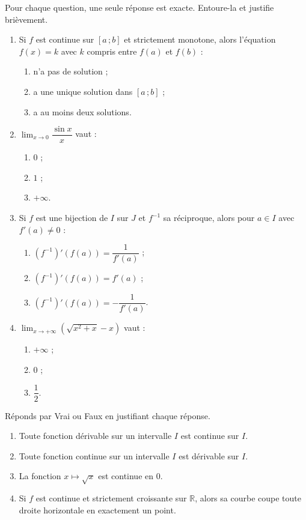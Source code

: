 \documentclass[11pt]{article}
\begin{document}
\begin{exercice}
Pour chaque question, une seule réponse est exacte. Entoure-la et justifie brièvement.
\begin{enumerate}
\item Si $f$ est continue sur $[a\,;b]$ et strictement monotone, alors l'équation $f(x)=k$ avec $k$ compris entre $f(a)$ et $f(b)$ :
\begin{enumerate}
\item n'a pas de solution ;
\item a une unique solution dans $[a\,;b]$ ;
\item a au moins deux solutions.
\end{enumerate}
\item $\displaystyle\lim_{x\to 0}\dfrac{\sin x}{x}$ vaut :
\begin{enumerate}
\item $0$ ; \item $1$ ; \item $+\infty$.
\end{enumerate}
\item Si $f$ est une bijection de $I$ sur $J$ et $f^{-1}$ sa réciproque, alors pour $a\in I$ avec $f'(a)\neq 0$ :
\begin{enumerate}
\item $(f^{-1})'(f(a))=\dfrac{1}{f'(a)}$ ;
\item $(f^{-1})'(f(a))=f'(a)$ ;
\item $(f^{-1})'(f(a))=-\dfrac{1}{f'(a)}$.
\end{enumerate}
\item $\displaystyle\lim_{x\to +\infty}\left(\sqrt{x^2+x}-x\right)$ vaut :
\begin{enumerate}
\item $+\infty$ ; \item $0$ ; \item $\dfrac{1}{2}$.
\end{enumerate}
\end{enumerate}
\end{exercice}

\begin{exercice}
Réponds par Vrai ou Faux en justifiant chaque réponse.
\begin{enumerate}
\item Toute fonction dérivable sur un intervalle $I$ est continue sur $I$.
\item Toute fonction continue sur un intervalle $I$ est dérivable sur $I$.
\item La fonction $x\mapsto \sqrt{x}$ est continue en $0$.
\item Si $f$ est continue et strictement croissante sur $\mathbb{R}$, alors sa courbe coupe toute droite horizontale en exactement un point.
\end{enumerate}
\end{exercice}
\end{document}
